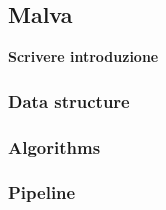 \documentclass[../main.tex]{subfiles}
\begin{document}
\subsection{Malva}

\textbf{Scrivere introduzione}

\subsubsection{Data structure}
\subsubsection{Algorithms}
\subsubsection{Pipeline}
\end{document}
